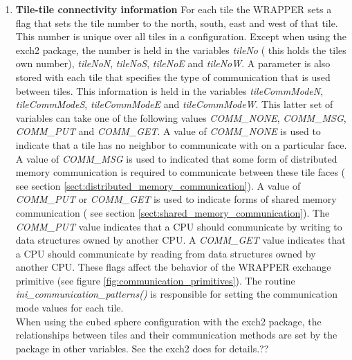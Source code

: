 \begin{enumerate}
\item {\bf Tile-tile connectivity information} For each tile the WRAPPER
sets a flag that sets the tile number to the north, south, east and
west of that tile. This number is unique over all tiles in a 
configuration. Except when using the exch2 package,
the number is held in the variables {\em tileNo}
( this holds the tiles own number), {\em tileNoN}, {\em tileNoS},
{\em tileNoE} and {\em tileNoW}. A parameter is also stored with each tile
that specifies the type of communication that is used between tiles.
This information is held in the variables {\em tileCommModeN},
{\em tileCommModeS}, {\em tileCommModeE} and {\em tileCommModeW}.
This latter set of variables can take one of the following values
{\em COMM\_NONE}, {\em COMM\_MSG}, {\em COMM\_PUT} and {\em COMM\_GET}.
A value of {\em COMM\_NONE} is used to indicate that a tile has no
neighbor to communicate with on a particular face. A value
of {\em COMM\_MSG} is used to indicated that some form of distributed
memory communication is required to communicate between
these tile faces ( see section \ref{sect:distributed_memory_communication}).
A value of {\em COMM\_PUT} or {\em COMM\_GET} is used to indicate 
forms of shared memory communication ( see section 
\ref{sect:shared_memory_communication}). The {\em COMM\_PUT} value indicates 
that a CPU should communicate by writing to data structures owned by another 
CPU. A {\em COMM\_GET} value indicates that a CPU should communicate by reading
from data structures owned by another CPU. These flags affect the behavior
of the WRAPPER exchange primitive 
(see figure \ref{fig:communication_primitives}). The routine 
{\em ini\_communication\_patterns()} is responsible for setting the
communication mode values for each tile.
\\

When using the cubed sphere configuration with the exch2 package, the 
relationships between tiles and their communication methods are set 
by the package in other variables.  See the exch2 docs for details.??



 \\


\end{enumerate}
